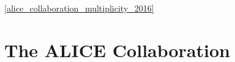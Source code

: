 \documentclass[ALICE,manyauthors]{cernphprep}
\begin{document}
\ref{alice_collaboration_multiplicity_2016}
\footnotesize

%   




        
\normalsize




\newpage
\appendix
%
%

\section*{The ALICE Collaboration}

\label{app:collab}

\end{document}
